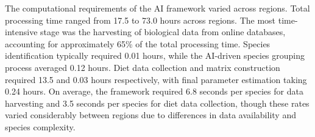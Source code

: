 The computational requirements of the AI framework varied across regions. Total processing time ranged from 17.5 to 73.0 hours across regions. The most time-intensive stage was the harvesting of biological data from online databases, accounting for approximately 65\% of the total processing time. Species identification typically required 0.01 hours, while the AI-driven species grouping process averaged 0.12 hours. Diet data collection and matrix construction required 13.5 and 0.03 hours respectively, with final parameter estimation taking 0.24 hours. On average, the framework required 6.8 seconds per species for data harvesting and 3.5 seconds per species for diet data collection, though these rates varied considerably between regions due to differences in data availability and species complexity.